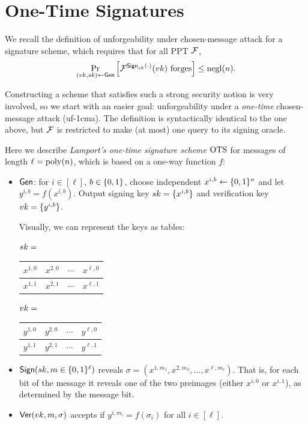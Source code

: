 \documentclass[11pt]{article}
\begin{document}
\thispagestyle{fancy}           %


\section{One-Time Signatures}
\label{sec:one-time-signatures}

We recall the definition of unforgeability under chosen-message attack
for a signature scheme, which requires that for all PPT $\mathcal{F}$,
\[ \Pr_{(vk,sk) \gets \mathsf{Gen}} \left[ \mathcal{F}^{\mathsf{Sign}_{sk}(\cdot)}(vk)
  \text{ forges} \right] \leq \operatorname{negl}(n). \]

Constructing a scheme that satisfies such a strong security notion is
very involved, so we start with an easier goal: unforgeability under a
\emph{one-time} chosen-message attack (uf-1cma).  The definition is
syntactically identical to the one above, but $\mathcal{F}$ is restricted to
make (at most) one query to its signing oracle.

\newcommand{\ots}{\scheme{OTS}}

Here we describe \emph{Lamport's one-time signature scheme} $\ots$ for
messages of length $\ell = \operatorname{poly}(n)$, which is based on a one-way
function $f$:
\begin{itemize}
\item $\mathsf{Gen}$: for $i \in [\ell]$, $b \in \{0,1\}$, choose independent
  $x^{i,b} \gets \{0,1\}^n$ and let $y^{i,b} = f(x^{i,b})$.  Output
  signing key $sk = \{x^{i,b}\}$ and verification key $vk =
  \{y^{i,b}\}$.

  Visually, we can represent the keys as tables:

  \renewcommand{\arraystretch}{1.2}
  $sk = $ \begin{tabular}{|c|c|c|c|}
    \hline
    $x^{1,0}$ & $x^{2,0}$ & $\cdots$ & $x^{\ell,0}$ \\ \hline
    $x^{1,1}$ & $x^{2,1}$ & $\cdots$ & $x^{\ell,1}$ \\ \hline
  \end{tabular}
  \qquad $vk = $
  \begin{tabular}{|c|c|c|c|}
    \hline
    $y^{1,0}$ & $y^{2,0}$ & $\cdots$ & $y^{\ell,0}$ \\ \hline
    $y^{1,1}$ & $y^{2,1}$ & $\cdots$ & $y^{\ell,1}$ \\ \hline
  \end{tabular}

\item $\mathsf{Sign}(sk,m \in \{0,1\}^{\ell})$ reveals
  $\sigma=(x^{1,m_1},x^{2,m_2},\ldots,x^{\ell,m_{\ell}})$.  That is,
  for each bit of the message it reveals one of the two preimages
  (either $x^{i,0}$ or $x^{i,1}$), as determined by the message bit.

\item $\mathsf{Ver}(vk,m,\sigma)$ accepts if $y^{i,m_i} = f(\sigma_i)$ for
  all $i \in [\ell]$.
\end{itemize}
\end{document}
